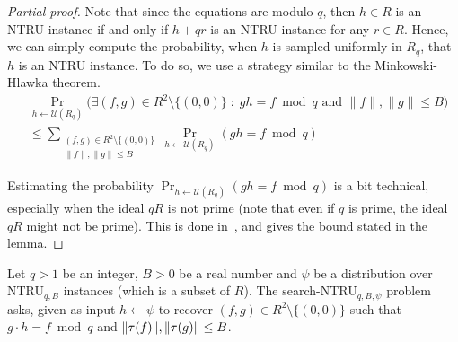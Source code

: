 \begin{proof}[Partial proof]
Note that since the equations are modulo $q$, then $h \in R$ is an NTRU instance if and only if $h + qr$ is an NTRU instance for any $r \in R$. Hence, we can simply compute the probability, when $h$ is sampled uniformly in $R_q$, that $h$ is an NTRU instance.
To do so, we use a strategy similar to the Minkowski-Hlawka theorem.
\begin{align*}
&\Pr_{h \leftarrow \mathcal{U}(R_q)} \Big(\exists (f,g) \in R^2\setminus\{(0,0)\} \; : \; gh = f \bmod q \text{ and } \|f\|, \|g\| \leq B \Big) \\
&\leq \sum_{\substack{(f,g) \in R^2\setminus\{(0,0)\} \\ \|f\|, \|g\| \leq B}} \Pr_{h \leftarrow \mathcal{U}(R_q)}(gh = f \bmod q)
\end{align*}

Estimating the probability $\Pr_{h \leftarrow \mathcal{U}(R_q)}(gh = f \bmod q)$ is a bit technical, especially when the ideal $qR$ is not prime (note that even if $q$ is prime, the ideal $qR$ might not be prime). This is done in~\cite[Lemma B.1]{PS21}, and gives the bound stated in the lemma.
%
%
\end{proof}


\begin{definition}
\label{def:NTRU}
Let $q >1$ be an integer, $B >0$ be a real number and $\psi$ be a distribution over NTRU$_{q,B}$ instances (which is a subset of $R$).
The search-NTRU$_{q, B, \psi}$ problem asks, given as input $h \leftarrow \psi$ to recover $(f, g) \in R^2\setminus\{(0,0)\}$ such that $g \cdot h = f \bmod q$ and $\|\tau(f)\|, \|\tau(g)\| \leq B$.
\end{definition}

